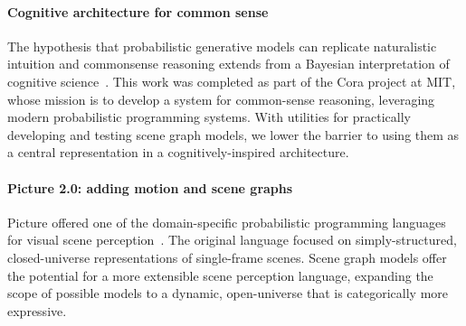 \paragraph{Cognitive architecture for common sense}
The hypothesis that probabilistic generative models can replicate naturalistic intuition and commonsense reasoning extends from a Bayesian interpretation of cognitive science~\cite{l2008bayesian}.
This work was completed as part of the Cora project at MIT, whose mission is to develop a system for common-sense reasoning, leveraging modern probabilistic programming systems.
With utilities for practically developing and testing scene graph models, we lower the barrier to using them as a central representation in a cognitively-inspired architecture.

\paragraph{Picture 2.0: adding motion and scene graphs}
Picture offered one of the domain-specific probabilistic programming languages for visual scene perception~\cite{kulkarni2015picture}.
The original language focused on simply-structured, closed-universe representations of single-frame scenes.
Scene graph models offer the potential for a more extensible scene perception language, expanding the scope of possible models to a dynamic, open-universe that is categorically more expressive.
